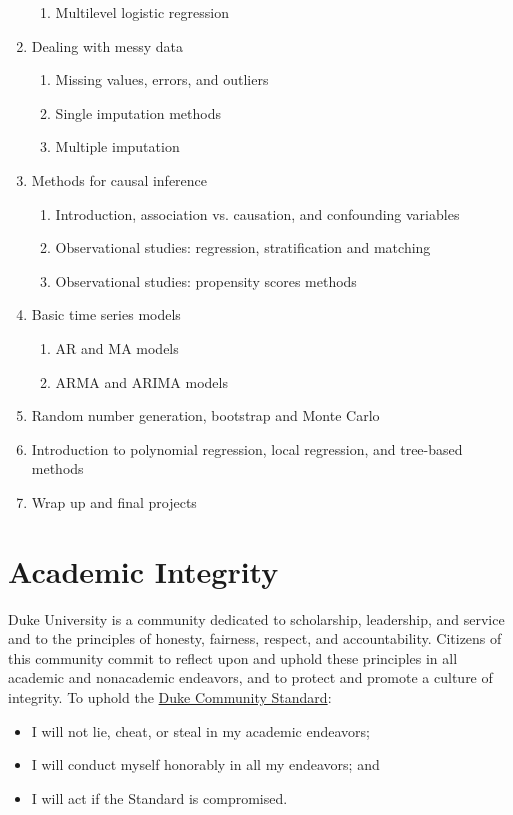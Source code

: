 \documentclass[11pt, a4paper]{article}
\begin{document}
\begin{enumerate}[label= {\color{darkblue}{\ArrowBoldRightStrobe}}]
\begin{enumerate}[label= {\color{cyan}{\Rectangle}}]
		\item Multilevel logistic regression
	\end{enumerate}
	\item Dealing with messy data
	\begin{enumerate}[label= {\color{cyan}{\Rectangle}}]
		\item Missing values, errors, and outliers
		\item Single imputation methods
		\item Multiple imputation
	\end{enumerate}
	\item Methods for causal inference
	\begin{enumerate}[label= {\color{cyan}{\Rectangle}}]
		\item Introduction, association vs. causation, and confounding variables
		\item Observational studies: regression, stratification and matching
		\item Observational studies: propensity scores methods
	\end{enumerate}
	\item Basic time series models
	\begin{enumerate}[label= {\color{cyan}{\Rectangle}}]
		\item AR and MA models
		\item ARMA and ARIMA models
	\end{enumerate}
	\item Random number generation, bootstrap and Monte Carlo
	\item Introduction to polynomial regression, local regression, and tree-based methods
	\item Wrap up and final projects
\end{enumerate}


\section{Academic Integrity}  
Duke University is a community dedicated to scholarship, leadership, and service and to the principles of honesty, fairness, respect, and accountability. Citizens of this community commit to reflect upon and uphold these principles in all academic and nonacademic endeavors, and to protect and promote a culture of integrity. To uphold the \href{https://studentaffairs.duke.edu/conduct/about-us/duke-community-standard}{Duke Community Standard}:
\begin{itemize}[label= {\color{darkred}{\Large \HandRight}}]
	\item I will not lie, cheat, or steal in my academic endeavors;
	\item I will conduct myself honorably in all my endeavors; and
	\item I will act if the Standard is compromised.
\end{itemize}
\end{document}
